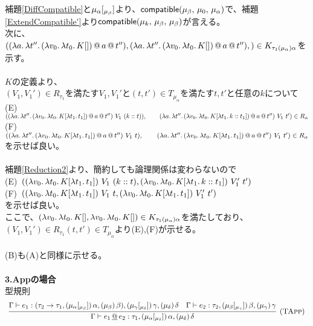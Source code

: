 補題\ref{DiffCompatible}と$\mu_{\alpha} \lbrack _{\mu_{\beta}} \rbrack$より、$\textsf{compatible}(\mu_{\beta},\,\mu_0,\,\mu_{\alpha})$で、補題\ref{ExtendCompatible'}より$\textsf{compatible}(\mu_k,\,\mu_{\beta},\,\mu_{\beta})$が言える。\\
次に、\\
$((\lambda{a}.\,{\lambda{t''}.\,{{{(\lambda{v_0}.\,{\lambda{t_0}.\,{K[]}})}\,@\,{a}}\,@\,{t''}}}),
  (\lambda{a}.\,{\lambda{t''}.\,{{{(\lambda{v_0}.\,{\lambda{t_0}.\,{K[]}})}\,@\,{a}}\,@\,{t''}}}),)\in K_{\tau_1(\mu_{\alpha})\alpha}$を示す。\\
  \\
  $K$の定義より、\\
  $(V_1, V_1')\in R_{\tau_1}$を満たす$V_1,V_1'$と$(t,t')\in T_{\mu_{\alpha}}$を満たす$t,t'$と任意の$k$について\\
  (E)\ $(\LamP{a}{\Lam{t''}{\App{\App{\LamP{v_0}{\Lam{t_0}{K[\Lam{t_1}{t_1}]}}}{a}}{t''}}}\ V_1\ (\Cons{k}{t})),\\
  \qquad \LamP{a}{\Lam{t''}{\App{\App{\LamP{v_0}{\Lam{t_0}{K[\Lam{t_1}{\Cons{k}{t_1}}]}}}{a}}{t''}}}\ V_1\ t')\in R_{\alpha}$\\
  (F)\ $(\LamP{a}{\Lam{t''}{\App{\App{\LamP{v_0}{\Lam{t_0}{K[\Lam{t_1}{t_1}]}}}{a}}{t''}}}\ V_1\ t),\\
  \qquad \LamP{a}{\Lam{t''}{\App{\App{\LamP{v_0}{\Lam{t_0}{K[\Lam{t_1}{t_1}]}}}{a}}{t''}}}\ V_1\ t')\in R_{\alpha}$\\
  を示せば良い。\\
  \\
  補題\ref{Reduction2}より、簡約しても論理関係は変わらないので\\
  (E)\ $(\LamP{v_0}{\Lam{t_0}{K[\Lam{t_1}{t_1}]}}\ V_1\ (\Cons{k}{t}), \LamP{v_0}{\Lam{t_0}{K[\Lam{t_1}{\Cons{k}{t_1}}]}}\ V_1'\ t')$\\
  (F)\ $((\lambda{v_0}.\,{\lambda{t_0}.\,{K[\lambda{t_1}.\,{t_1}]}})\ V_1\ t, (\lambda{v_0}.\,{\lambda{t_0}.\,{K[\lambda{t_1}.\,{t_1}]}})\ V_1'\ t')$\\
  を示せば良い。\\
  ここで、$(\lambda{v_0}.\,{\lambda{t_0}.\,{K[]}}, \lambda{v_0}.\,{\lambda{t_0}.\,{K[]}})\in  K_{\tau_1(\mu_{\alpha})\alpha}$を満たしており、\\
  $(V_1, V_1')\in R_{\tau_1} (t,t')\in T_{\mu_{\alpha}}$より(E),(F)が示せる。\\
  \\
  (B)も(A)と同様に示せる。
\\
\\  
\textbf{3.Appの場合}\\
型規則  
\[
\begin{array}{c}
  \infer[\TApp]
      {\JudgeTrail{\Gamma}{\DApp{e_1}{e_2}}
                  {\tau_1}{\TrailsType{\alpha}{\delta}}{\TrailType{\delta}}}
      {\JudgeTrail{\Gamma}{e_1}
                  {\ArrowTrailP{\tau_2}{\tau_1}{\TrailsType{\alpha}{\beta}}
                                               {\TrailType{\beta}}}
                  {\TrailsType{\gamma}{\delta}}
                  {\TrailType{\delta}}
      &\JudgeTrail{\Gamma}{e_2}{\tau_2}{\TrailsType{\beta}{\gamma}}{\TrailType{\gamma}}}
\end{array}
\]
